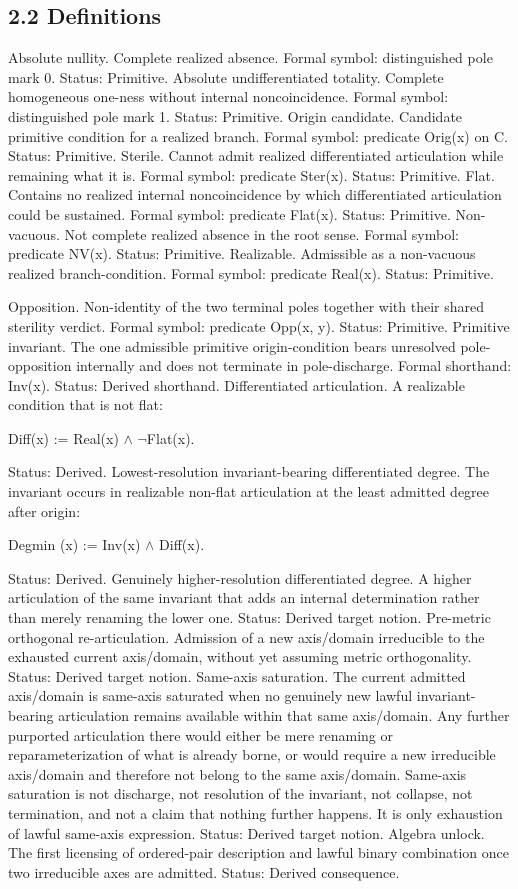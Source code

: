 \documentclass[11pt]{article}
\begin{document}
\subsection{2.2 Definitions}\label{definitions}

Absolute nullity. Complete realized absence. Formal symbol: distinguished pole mark 0. Status: Primitive. Absolute undifferentiated totality. Complete homogeneous one-ness without internal noncoincidence. Formal symbol: distinguished pole mark 1. Status: Primitive. Origin candidate. Candidate primitive condition for a realized branch. Formal symbol: predicate Orig(x) on C. Status: Primitive. Sterile. Cannot admit realized differentiated articulation while remaining what it is. Formal symbol: predicate Ster(x). Status: Primitive. Flat. Contains no realized internal noncoincidence by which differentiated articulation could be sustained. Formal symbol: predicate Flat(x). Status: Primitive. Non-vacuous. Not complete realized absence in the root sense. Formal symbol: predicate NV(x). Status: Primitive. Realizable. Admissible as a non-vacuous realized branch-condition. Formal symbol: predicate Real(x). Status: Primitive.

Opposition. Non-identity of the two terminal poles together with their shared sterility verdict. Formal symbol: predicate Opp(x, y). Status: Primitive. Primitive invariant. The one admissible primitive origin-condition bears unresolved pole-opposition internally and does not terminate in pole-discharge. Formal shorthand: Inv(x). Status: Derived shorthand. Differentiated articulation. A realizable condition that is not flat:

Diff(x) := Real(x) $\wedge$ $\neg$Flat(x).

Status: Derived. Lowest-resolution invariant-bearing differentiated degree. The invariant occurs in realizable non-flat articulation at the least admitted degree after origin:

Degmin (x) := Inv(x) $\wedge$ Diff(x).

Status: Derived. Genuinely higher-resolution differentiated degree. A higher articulation of the same invariant that adds an internal determination rather than merely renaming the lower one. Status: Derived target notion. Pre-metric orthogonal re-articulation. Admission of a new axis/domain irreducible to the exhausted current axis/domain, without yet assuming metric orthogonality. Status: Derived target notion. Same-axis saturation. The current admitted axis/domain is same-axis saturated when no genuinely new lawful invariant-bearing articulation remains available within that same axis/domain. Any further purported articulation there would either be mere renaming or reparameterization of what is already borne, or would require a new irreducible axis/domain and therefore not belong to the same axis/domain. Same-axis saturation is not discharge, not resolution of the invariant, not collapse, not termination, and not a claim that nothing further happens. It is only exhaustion of lawful same-axis expression. Status: Derived target notion. Algebra unlock. The first licensing of ordered-pair description and lawful binary combination once two irreducible axes are admitted. Status: Derived consequence.
\end{document}
